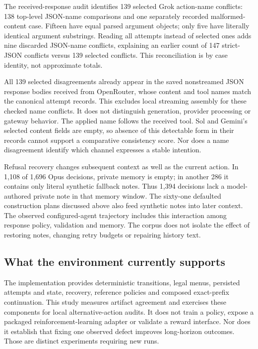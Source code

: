 The received-response audit identifies 139 selected Grok action-name conflicts: 138 top-level JSON-name comparisons and one separately recorded malformed-content case. Fifteen have equal parsed argument objects; only five have literally identical argument substrings. Reading all attempts instead of selected ones adds nine discarded JSON-name conflicts, explaining an earlier count of 147 strict-JSON conflicts versus 139 selected conflicts. This reconciliation is by case identity, not approximate totals.

All 139 selected disagreements already appear in the saved nonstreamed JSON response bodies received from OpenRouter, whose content and tool names match the canonical attempt records. This excludes local streaming assembly for these checked name conflicts. It does not distinguish generation, provider processing or gateway behavior. The applied name follows the received tool. Sol and Gemini's selected content fields are empty, so absence of this detectable form in their records cannot support a comparative consistency score. Nor does a name disagreement identify which channel expresses a stable intention.

Refusal recovery changes subsequent context as well as the current action. In 1,108 of 1,696 Opus decisions, private memory is empty; in another 286 it contains only literal synthetic fallback notes. Thus 1,394 decisions lack a model-authored private note in that memory window. The sixty-one defaulted construction plans discussed above also feed synthetic notes into later context. The observed configured-agent trajectory includes this interaction among response policy, validation and memory. The corpus does not isolate the effect of restoring notes, changing retry budgets or repairing history text.

\subsection{What the environment currently supports}

The implementation provides deterministic transitions, legal menus, persisted attempts and state, recovery, reference policies and composed exact-prefix continuation. This study measures artifact agreement and exercises these components for local alternative-action audits. It does not train a policy, expose a packaged reinforcement-learning adapter or validate a reward interface. Nor does it establish that fixing one observed defect improves long-horizon outcomes. Those are distinct experiments requiring new runs.

